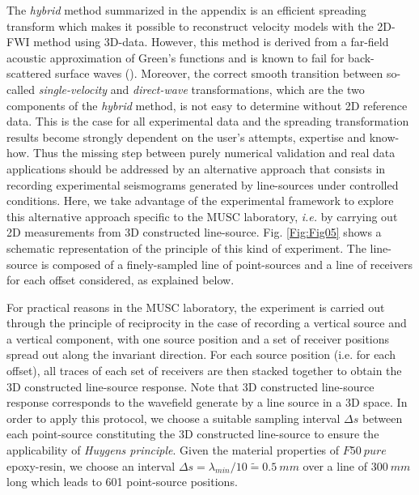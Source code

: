 \documentclass[extra,mreferee]{gji}
\begin{document}
The \textit{hybrid} method summarized in the appendix is an efficient spreading transform which makes it possible to reconstruct velocity models with the 2D-FWI method using 3D-data. However, this method is derived from a far-field acoustic approximation of Green's functions and is known to fail for back-scattered surface waves (\cite{schafer2014lss,groos2014role}). Moreover, the correct smooth transition between so-called \textit{single-velocity} and \textit{direct-wave} transformations, which are the two components of the \textit{hybrid} method, is not easy to determine without 2D reference data. This is the case for all experimental data and the spreading transformation results become strongly dependent on the user's attempts, expertise and know-how.
Thus the missing step between purely numerical validation and real data applications should be addressed by an alternative approach that consists in recording experimental seismograms generated by line-sources under controlled conditions. Here, we take advantage of the experimental framework to explore this alternative approach specific to the MUSC laboratory, \textit{i.e.} by carrying out 2D measurements from 3D constructed line-source. Fig. \ref{Fig:Fig05} shows a schematic representation of the principle of this kind of experiment. The line-source is composed of a finely-sampled line of point-sources and a line of receivers for each offset considered, as explained below. 

For practical reasons in the MUSC laboratory, the experiment is carried out through the principle of reciprocity in the case of recording a vertical source and a vertical component, with one source position and a set of receiver positions spread out along the invariant direction. For each source position (i.e. for each offset), all traces of each set of receivers are then stacked together to obtain the 3D constructed line-source response. Note that 3D constructed line-source response corresponds to the wavefield generate by a line source in a 3D space. In order to apply this protocol, we choose a suitable sampling interval $\Delta s$ between each point-source constituting the 3D constructed line-source to ensure the applicability of \textit{Huygens principle}. Given the material properties of $F50\ pure$ epoxy-resin, we choose an interval $\Delta s=\lambda_{min}/10 \tilde{=}0.5\ mm$ over a line of $300\ mm$ long which leads to 601 point-source positions.
\end{document}
